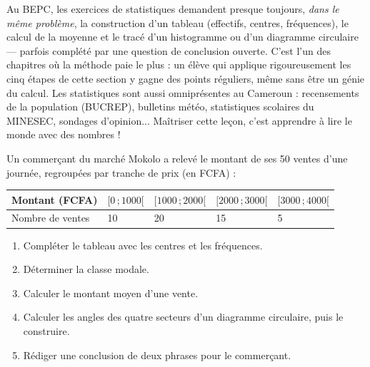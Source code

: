 \documentclass[11pt]{article}
\begin{document}
\begin{savaistu}
Au BEPC, les exercices de statistiques demandent presque toujours, \emph{dans le même problème}, la construction d'un tableau (effectifs, centres, fréquences), le calcul de la moyenne et le tracé d'un histogramme ou d'un diagramme circulaire — parfois complété par une question de conclusion ouverte. C'est l'un des chapitres où la méthode paie le plus : un élève qui applique rigoureusement les cinq étapes de cette section y gagne des points réguliers, même sans être un génie du calcul. Les statistiques sont aussi omniprésentes au Cameroun : recensements de la population (BUCREP), bulletins météo, statistiques scolaires du MINESEC, sondages d'opinion... Maîtriser cette leçon, c'est apprendre à lire le monde avec des nombres !
\end{savaistu}

\begin{exercice}
Un commerçant du marché Mokolo a relevé le montant de ses 50 ventes d'une journée, regroupées par tranche de prix (en FCFA) :
\begin{center}
\begin{tabularx}{\linewidth}{|l|X|X|X|X|}
\hline
\rowcolor{popgoldL} Montant (FCFA) & $[0\,;1000[$ & $[1000\,;2000[$ & $[2000\,;3000[$ & $[3000\,;4000[$ \\
\hline
Nombre de ventes & 10 & 20 & 15 & 5 \\
\hline
\end{tabularx}
\end{center}
\begin{enumerate}
\item Compléter le tableau avec les centres et les fréquences.
\item Déterminer la classe modale.
\item Calculer le montant moyen d'une vente.
\item Calculer les angles des quatre secteurs d'un diagramme circulaire, puis le construire.
\item Rédiger une conclusion de deux phrases pour le commerçant.
\end{enumerate}
\end{exercice}
\end{document}

